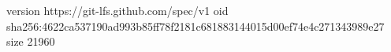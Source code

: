 version https://git-lfs.github.com/spec/v1
oid sha256:4622ca537190ad993b85ff78f2181c681883144015d00ef74e4c271343989e27
size 21960
